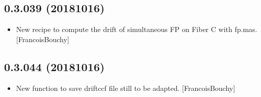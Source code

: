 \documentclass[a4paper,10pt,english]{report}
\begin{document}
\subsection{0.3.039 (2018\sphinxhyphen{}10\sphinxhyphen{}16)}
\label{\detokenize{misc/changelog:id312}}\begin{itemize}
\item {} 
New recipe to compute the drift of simultaneous FP on Fiber C with
fp.mas. {[}FrancoisBouchy{]}

\end{itemize}


\subsection{0.3.044 (2018\sphinxhyphen{}10\sphinxhyphen{}16)}
\label{\detokenize{misc/changelog:id313}}\begin{itemize}
\item {} 
New function  to save driftccf file
 still to be adapted. {[}FrancoisBouchy{]}

\end{itemize}
\end{document}
